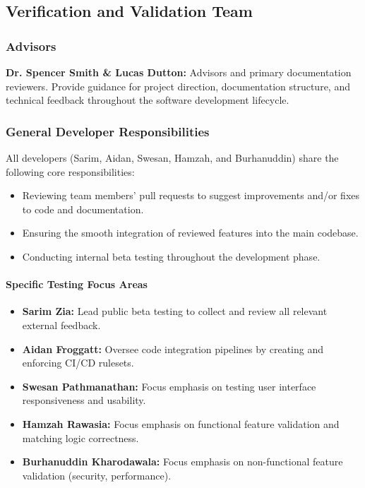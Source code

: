 \documentclass[12pt, titlepage]{article}
\begin{document}
\subsection{Verification and Validation Team}

\subsubsection*{Advisors}
\textbf{Dr. Spencer Smith \& Lucas Dutton:} Advisors and primary documentation reviewers. Provide guidance for project direction, documentation structure, and technical feedback throughout the software development lifecycle.

\subsubsection*{General Developer Responsibilities}
All developers (Sarim, Aidan, Swesan, Hamzah, and Burhanuddin) share the following core responsibilities:
\begin{itemize}
    \item Reviewing team members' pull requests to suggest improvements and/or fixes to code and documentation.
    \item Ensuring the smooth integration of reviewed features into the main codebase.
    \item Conducting internal beta testing throughout the development phase.
\end{itemize}

\paragraph{Specific Testing Focus Areas}
\begin{itemize}
    \item \textbf{Sarim Zia:} Lead public beta testing to collect and review all relevant external feedback.
    \item \textbf{Aidan Froggatt:} Oversee code integration pipelines by creating and enforcing CI/CD rulesets.
    \item \textbf{Swesan Pathmanathan:} Focus emphasis on testing user interface responsiveness and usability.
    \item \textbf{Hamzah Rawasia:} Focus emphasis on functional feature validation and matching logic correctness.
    \item \textbf{Burhanuddin Kharodawala:} Focus emphasis on non-functional feature validation (security, performance).
\end{itemize}
\end{document}
